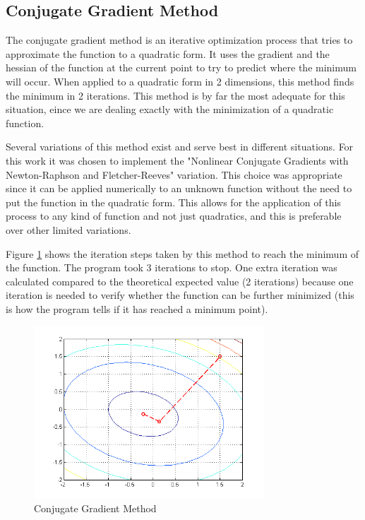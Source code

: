 \documentclass[journal]{IEEEtran}
\begin{document}
\subsection{Conjugate Gradient Method}

The conjugate gradient method is an iterative optimization process that tries to approximate the function to a quadratic form. It uses the gradient and the hessian of the function at the current point to try to predict where the minimum will occur. When applied to a quadratic form in 2 dimensions, this method finds the minimum in 2 iterations. This method is by far the most adequate for this situation, eince we are dealing exactly with the minimization of a quadratic function.

Several variations of this method exist and serve best in different situations. For this work it was chosen to implement the "Nonlinear Conjugate Gradients with Newton-Raphson and Fletcher-Reeves" variation\cite{shewchuk1994introduction}. This choice was appropriate since it can be applied numerically to an unknown function without the need to put the function in the quadratic form. This allows for the application of this process to any kind of function and not just quadratics, and this is preferable over other limited variations.

Figure \ref{figCG} shows the iteration steps taken by this method to reach the minimum of the function. The program took 3 iterations to stop. One extra iteration was calculated compared to the theoretical expected value (2 iterations) because one iteration is needed to verify whether the function can be further minimized (this is how the program tells if it has reached a minimum point).

\begin{figure}[H]
\centering
\includegraphics[width=3.4in]{figures/2d-conjugateGradient.png}
\caption{Conjugate Gradient Method}
\label{figCG}
\end{figure}
\end{document}
